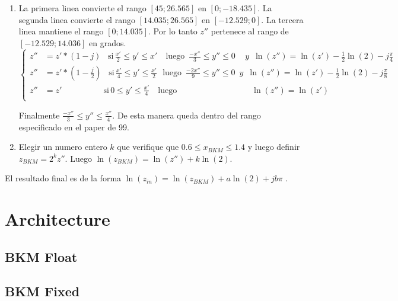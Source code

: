 \documentclass[10pt,a4paper]{book}
\begin{document}
\begin{enumerate}
   \item{La primera linea convierte el rango $[45;26.565]$ en $[0;-18.435]$. La segunda linea convierte el rango $[14.035;26.565]$ en $[-12.529;0]$. La tercera linea mantiene el rango $[0;14.035]$. Por lo tanto $z''$ pertenece al rango de $[-12.529;14.036]$ en grados.
         \begin{equation} \label{eq:L_range_ext_3}
            \left\{
               \begin{aligned}
                  z'' &= z'*(1-j)            \,\,\,\,\,  \text{si}\, \frac{x'}{2} \leq y' \leq        x'       \,\,\,\,\,\,\text{luego}\,\,\,\frac{-x''}{3}  \leq y''\leq        0\, \,\,\,\,\,\,y \,\,\,\ln(z'')=\ln(z')-\frac{1}{2}\ln(2)-j\frac{\pi}{4}\\
                  z'' &= z'*(1-\frac{j}{2})  \,\,\,\,\,  \text{si}\, \frac{x'}{4} \leq y' \leq  \frac{x'}{2}       \,\,\,\,\text{luego}\,\,\,\frac{-2x''}{9} \leq y''\leq        0\,         \,\,y \,\,\,\ln(z'')=\ln(z')-\frac{1}{2}\ln(2)-j\frac{\pi}{8}\\
                  z'' &= z' \quad\quad\quad\quad\quad    \text{si}\, 0           \leq y' \leq  \frac{x'}{4}   \,\,\,\,\,\,\text{luego}\,\,\,\,\,\,\,\,\,\,\,\quad\quad\quad\quad\quad\quad\quad    \,    \ln(z'')=\ln(z')                                 \\
               \end{aligned}
            \right.
         \end{equation}

         Finalmente $\frac{-x''}{3} \leq y'' \leq  \frac{x''}{4}$. De esta manera queda dentro del rango especificado en el paper de 99.
      }
   \item{Elegir un numero entero $k$ que verifique que $0.6 \leq x_{BKM} \leq 1.4$ y luego definir $z_{BKM}=2^k z''$. Luego $\ln(z_{BKM})=\ln(z'')+k \ln(2)$.}
   \end{enumerate}


   El resultado final es de la forma $\ln(z_{in}) = \ln(z_{BKM}) + a \ln(2) + j b \pi$ .


\chapter{Architecture}

   \section{BKM Float}

   \section{BKM Fixed}
\end{document}
